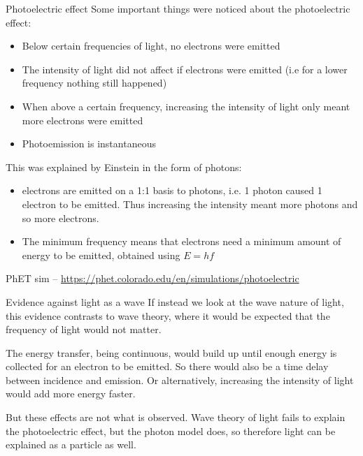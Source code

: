 \documentclass[../Main.tex]{subfiles}
\begin{document}
\begin{frame}{Photoelectric effect}
    Some important things were noticed about the photoelectric effect:
    \begin{itemize}
        \item Below certain frequencies of light, no electrons were emitted \pause
        \item The intensity of light did not affect if electrons were emitted (i.e for a lower frequency nothing still happened) \pause
        \item When above a certain frequency, increasing the intensity of light only meant more electrons were emitted \pause
        \item Photoemission is instantaneous
        \end{itemize}
        
    \pause
    This was explained by Einstein in the form of photons:
    \begin{itemize}
        \item electrons are emitted on a 1:1 basis to photons, i.e. 1 photon caused 1 electron to be emitted. Thus increasing the intensity meant more photons and so more electrons. \pause
        \item The minimum frequency means that electrons need a minimum amount of energy to be emitted, obtained using $E=hf$
    \end{itemize}
    
    PhET sim -- \url{https://phet.colorado.edu/en/simulations/photoelectric}
\end{frame}

\begin{frame}{Evidence against light as a wave}
    If instead we look at the wave nature of light, this evidence contrasts to wave theory, where it would be expected that the frequency of light would not matter. 
    \newline 
    
    \newline
    The energy transfer, being continuous, would build up until enough energy is collected for an electron to be emitted. So there would also be a time delay between incidence and emission. Or alternatively, increasing the intensity of light would add more energy faster. 
    \newline
    
    \newline
    But these effects are not what is observed. Wave theory of light fails to explain the photoelectric effect, but the photon model does, so therefore light can be explained as a particle as well.
\end{frame}
\end{document}
